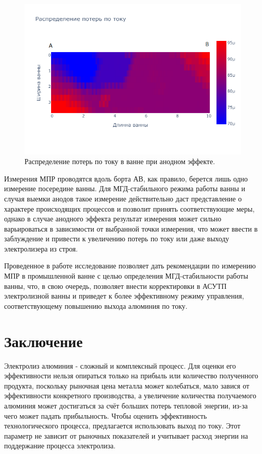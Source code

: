 \documentclass{article}
\begin{document}
\begin{figure}[H]
\centering
\includegraphics[width=0.8\linewidth]{anodloss.png}
\caption{Распределение потерь по току в ванне при анодном эффекте.\label{fig:raspAnod}}
\end{figure}

Измерения МПР проводятся вдоль борта АВ, как правило, берется лишь одно измерение посередине ванны. Для МГД-стабильного режима работы ванны и случая выемки анодов такое измерение действительно даст представление о характере происходящих процессов и позволит принять соответствующие меры, однако в случае анодного эффекта результат измерения может сильно варьироваться в зависимости от выбранной точки измерения, что может ввести в заблуждение и привести к увеличению потерь по току или даже выходу электролизера из строя.

Проведенное в работе исследование позволяет дать рекомендации по измерению МПР в промышленной ванне с целью определения МГД-стабильности работы ванны, что, в свою очередь, позволяет внести корректировки в АСУТП электролизной ванны и приведет к более эффективному режиму управления, соответствующему повышению выхода алюминия по току.

\section*{Заключение}

Электролиз алюминия - сложный и комплексный процесс. Для оценки его эффективности нельзя опираться только на прибыль или количество полученного продукта, поскольку рыночная цена металла может колебаться, мало завися от эффективности конкретного производства, а увеличение количества получаемого алюминия может достигаться за счёт больших потерь тепловой энергии, из-за чего может падать прибыльность. Чтобы оценить эффективность технологического процесса, предлагается использовать выход по току. Этот параметр не зависит от рыночных показателей и учитывает расход энергии на поддержание процесса электролиза.
\end{document}
